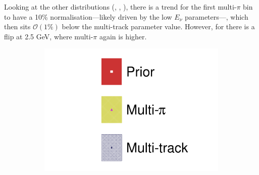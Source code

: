 Looking at the other distributions (\nue, \numubar, \nuebar), there is a trend for the first multi-$\pi$ bin to have a 10\% normalisation---likely driven by the low $E_\nu$ \numu parameters---, which then sits $\mathcal{O}(1\%)$ below the multi-track parameter value. However, for \nue there is a flip at 2.5 GeV, where multi-$\pi$ again is higher.
\begin{figure}[h]
	\centering
	\begin{subfigure}[t]{0.10\textwidth}
		\includegraphics[width=\textwidth,page=1, trim={0mm 0mm 0mm 9mm}, clip]{figures/mach3/2018/data/2018a_FixedCov_RedCov_Mpi_Data_merg_2018a_NewDetMatrix_OrderSwitched_Data2to8_ActualData_merge}
	\end{subfigure}
	

\end{figure}
